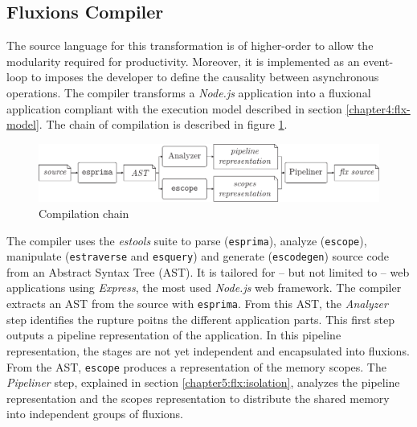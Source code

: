 \subsection{Fluxions Compiler} \label{chapter5:flx:compiler}

The source language for this transformation is of higher-order to allow the modularity required for productivity. 
Moreover, it is implemented as an event-loop to imposes the developer to define the causality between asynchronous operations.
The compiler transforms a \textit{Node.js} application into a fluxional application compliant with the execution model described in section \ref{chapter4:flx-model}.
The chain of compilation is described in figure \ref{fig:compilation}.

\begin{figure}
  \includegraphics[width=\linewidth]{../resources/compiler-stream.pdf}
  \caption{Compilation chain}
  \label{fig:compilation}
\end{figure}

The compiler uses the \textit{estools} suite to parse (\texttt{esprima}), analyze (\texttt{escope}), manipulate (\texttt{estraverse} and \texttt{esquery}) and generate (\texttt{escodegen}) source code from an Abstract Syntax Tree (AST).
It is tailored for -- but not limited to -- web applications using \textit{Express}, the most used \textit{Node.js} web framework.
The compiler extracts an AST from the source with \texttt{esprima}.
From this AST, the \textit{Analyzer} step identifies the rupture poitns the different application parts. %
This first step outputs a pipeline representation of the application.
In this pipeline representation, the stages are not yet independent and encapsulated into fluxions.
From the AST, \texttt{escope} produces a representation of the memory scopes.
The \textit{Pipeliner} step, explained in section \ref{chapter5:flx:isolation}, analyzes the pipeline representation and the scopes representation to distribute the shared memory into independent groups of fluxions.

